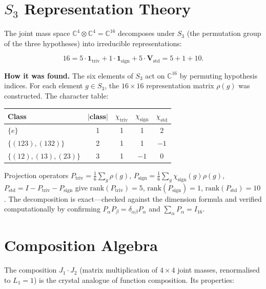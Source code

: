 \documentclass[11pt,a4paper]{article}
\theoremstyle{definition}
\theoremstyle{remark}
\newcommand{\C}{\mathbb{C}}
\begin{document}
\section{$S_3$ Representation Theory}\label{sec:S3}

The joint mass space $\C^4 \otimes \C^4 = \C^{16}$ decomposes under $S_3$ (the permutation group of the three hypotheses) into irreducible representations:

\begin{equation}
16 = 5 \cdot \mathbf{1}_{\mathrm{triv}} + 1 \cdot \mathbf{1}_{\mathrm{sign}} + 5 \cdot \mathbf{V}_{\mathrm{std}} = 5 + 1 + 10.
\end{equation}

\textbf{How it was found.} The six elements of $S_3$ act on $\C^{16}$ by permuting hypothesis indices. For each element $g \in S_3$, the $16 \times 16$ representation matrix $\rho(g)$ was constructed. The character table:

\begin{center}
\begin{tabular}{lcccc}
\toprule
Class & $|$class$|$ & $\chi_{\mathrm{triv}}$ & $\chi_{\mathrm{sign}}$ & $\chi_{\mathrm{std}}$ \\
\midrule
$\{e\}$ & 1 & 1 & 1 & 2 \\
$\{(123),(132)\}$ & 2 & 1 & 1 & $-1$ \\
$\{(12),(13),(23)\}$ & 3 & 1 & $-1$ & 0 \\
\bottomrule
\end{tabular}
\end{center}

Projection operators $P_{\mathrm{triv}} = \frac{1}{6}\sum_g \rho(g)$, $P_{\mathrm{sign}} = \frac{1}{6}\sum_g \chi_{\mathrm{sign}}(g)\rho(g)$, $P_{\mathrm{std}} = I - P_{\mathrm{triv}} - P_{\mathrm{sign}}$ give $\mathrm{rank}(P_{\mathrm{triv}}) = 5$, $\mathrm{rank}(P_{\mathrm{sign}}) = 1$, $\mathrm{rank}(P_{\mathrm{std}}) = 10$. The decomposition is exact---checked against the dimension formula and verified computationally by confirming $P_\alpha P_\beta = \delta_{\alpha\beta} P_\alpha$ and $\sum_\alpha P_\alpha = I_{16}$.


\section{Composition Algebra}\label{sec:composition}

The composition $J_1 \cdot J_2$ (matrix multiplication of $4\times 4$ joint masses, renormalised to $L_1 = 1$) is the crystal analogue of function composition. Its properties:
\end{document}
